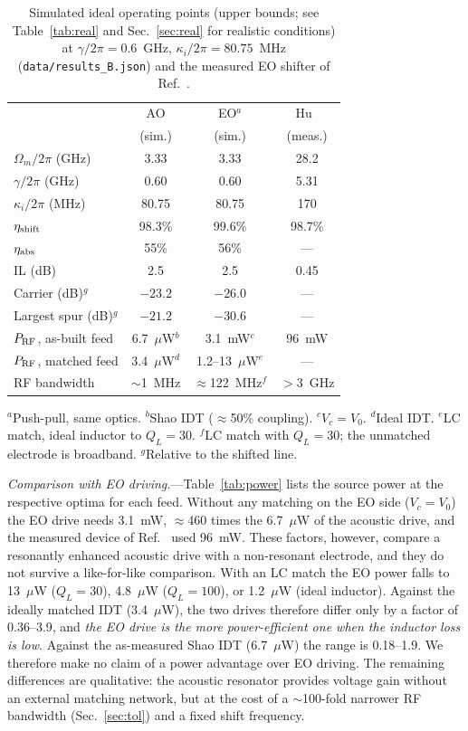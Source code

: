 \documentclass[aps,prapplied,reprint,superscriptaddress,amsmath,amssymb,floatfix]{revtex4-2}
\newcommand{\etash}{\eta_{\rm shift}}
\newcommand{\etaabs}{\eta_{\rm abs}}
\newcommand{\Pg}{P_{\rm RF}}
\begin{document}
\begin{table}[b]
\caption{Simulated ideal operating points (upper bounds; see Table~\ref{tab:real} and Sec.~\ref{sec:real} for realistic conditions) at $\gamma/2\pi=0.6$~GHz, $\kappa_i/2\pi=80.75$~MHz (\texttt{data/results\_B.json}) and the measured EO shifter of Ref.~\cite{Hu2021}.}
\label{tab:main}
\begin{ruledtabular}
\small
\begin{tabular}{lccc}
 & AO & EO$^{a}$ & Hu~\cite{Hu2021}\\
 & (sim.) & (sim.) & (meas.)\\
\hline
$\Omega_m/2\pi$ (GHz) & 3.33 & 3.33 & 28.2\\
$\gamma/2\pi$ (GHz) & 0.60 & 0.60 & 5.31\\
$\kappa_i/2\pi$ (MHz) & 80.75 & 80.75 & 170\\
$\etash$ & 98.3\% & 99.6\% & 98.7\%\\
$\etaabs$ & 55\% & 56\% & ---\\
IL (dB) & 2.5 & 2.5 & 0.45\\
Carrier (dB)$^{g}$ & $-23.2$ & $-26.0$ & ---\\
Largest spur (dB)$^{g}$ & $-21.2$ & $-30.6$ & ---\\
$\Pg$, as-built feed & 6.7~$\mu$W$^{b}$ & 3.1~mW$^{c}$ & 96~mW\\
$\Pg$, matched feed & 3.4~$\mu$W$^{d}$ & 1.2--13~$\mu$W$^{e}$ & ---\\
RF bandwidth & $\sim$1~MHz & $\approx$122~MHz$^{f}$ & $>$3~GHz\\
\end{tabular}
\end{ruledtabular}
\raggedright\footnotesize $^{a}$Push-pull, same optics. $^{b}$Shao IDT ($\approx$50\% coupling). $^{c}$$V_c=V_0$. $^{d}$Ideal IDT. $^{e}$LC match, ideal inductor to $Q_L=30$. $^{f}$LC match with $Q_L=30$; the unmatched electrode is broadband. $^{g}$Relative to the shifted line.
\end{table}

\emph{Comparison with EO driving.}---Table~\ref{tab:power} lists the source power at the respective optima for each feed. Without any matching on the EO side ($V_c=V_0$) the EO drive needs 3.1~mW, $\approx$460 times the 6.7~$\mu$W of the acoustic drive, and the measured device of Ref.~\cite{Hu2021} used 96~mW. These factors, however, compare a resonantly enhanced acoustic drive with a non-resonant electrode, and they do not survive a like-for-like comparison. With an LC match the EO power falls to 13~$\mu$W ($Q_L=30$), 4.8~$\mu$W ($Q_L=100$), or 1.2~$\mu$W (ideal inductor). Against the ideally matched IDT (3.4~$\mu$W), the two drives therefore differ only by a factor of 0.36--3.9, and \emph{the EO drive is the more power-efficient one when the inductor loss is low}. Against the as-measured Shao IDT (6.7~$\mu$W) the range is 0.18--1.9. We therefore make no claim of a power advantage over EO driving. The remaining differences are qualitative: the acoustic resonator provides voltage gain without an external matching network, but at the cost of a $\sim$100-fold narrower RF bandwidth (Sec.~\ref{sec:tol}) and a fixed shift frequency.
\end{document}
